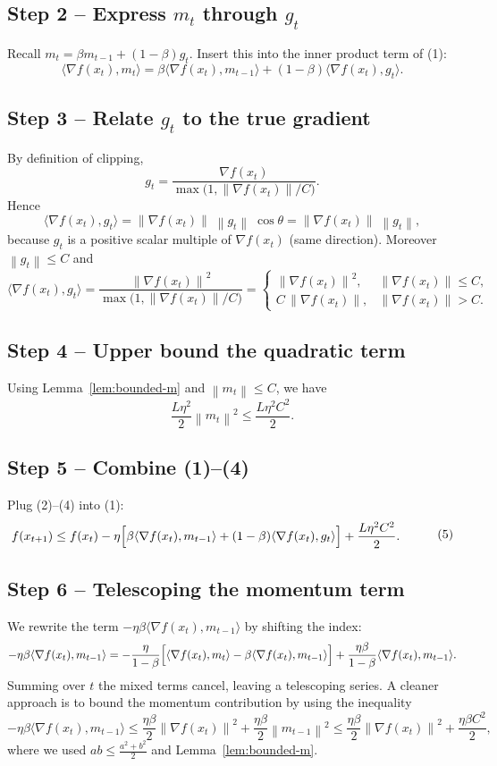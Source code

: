 \documentclass{article}
\newcommand{\norm}[1]{\left\lVert #1\right\rVert}
\newcommand{\grad}{\nabla}
\begin{document}
\subsection*{Step 2 – Express $m_t$ through $g_t$}
Recall $m_t=\beta m_{t-1}+(1-\beta)g_t$.  
Insert this into the inner product term of (1):
\[
\langle\grad f(x_t),m_t\rangle
= \beta\langle\grad f(x_t),m_{t-1}\rangle
+(1-\beta)\langle\grad f(x_t),g_t\rangle .
\tag{2}
\]

\subsection*{Step 3 – Relate $g_t$ to the true gradient}
By definition of clipping,
\[
g_t = \frac{\grad f(x_t)}{\max\!\bigl(1,\norm{\grad f(x_t)}/C\bigr)} .
\]
Hence
\[
\langle\grad f(x_t),g_t\rangle
= \norm{\grad f(x_t)}\;\norm{g_t}\;\cos\theta
= \norm{\grad f(x_t)}\;\norm{g_t},
\]
because $g_t$ is a positive scalar multiple of $\grad f(x_t)$ (same direction). Moreover $\norm{g_t}\le C$ and
\[
\langle\grad f(x_t),g_t\rangle
= \frac{\norm{\grad f(x_t)}^2}{\max\!\bigl(1,\norm{\grad f(x_t)}/C\bigr)}
=
\begin{cases}
\norm{\grad f(x_t)}^2, &\norm{\grad f(x_t)}\le C,\\[4pt]
C\,\norm{\grad f(x_t)}, &\norm{\grad f(x_t)}> C .
\end{cases}
\tag{3}
\]

\subsection*{Step 4 – Upper bound the quadratic term}
Using Lemma~\ref{lem:bounded-m} and $\norm{m_t}\le C$, we have
\[
\frac{L\eta^2}{2}\norm{m_t}^2 \le \frac{L\eta^2 C^2}{2}.
\tag{4}
\]

\subsection*{Step 5 – Combine (1)–(4)}
Plug (2)–(4) into (1):
\[
\begin{aligned}
f(x_{t+1})
&\le f(x_t)
-\eta\Bigl[\beta\langle\grad f(x_t),m_{t-1}\rangle
+(1-\beta)\langle\grad f(x_t),g_t\rangle\Bigr]
+\frac{L\eta^2 C^2}{2}.
\end{aligned}
\tag{5}
\]

\subsection*{Step 6 – Telescoping the momentum term}
We rewrite the term $-\eta\beta\langle\grad f(x_t),m_{t-1}\rangle$ by shifting the index:
\[
-\eta\beta\langle\grad f(x_t),m_{t-1}\rangle
= -\frac{\eta}{1-\beta}
\Bigl[\langle\grad f(x_t),m_t\rangle-\beta\langle\grad f(x_t),m_{t-1}\rangle\Bigr]
+\frac{\eta\beta}{1-\beta}\langle\grad f(x_t),m_{t-1}\rangle .
\]
Summing over $t$ the mixed terms cancel, leaving a telescoping series.  
A cleaner approach is to bound the momentum contribution by using the inequality
\[
-\eta\beta\langle\grad f(x_t),m_{t-1}\rangle
\le \frac{\eta\beta}{2}\norm{\grad f(x_t)}^2
+ \frac{\eta\beta}{2}\norm{m_{t-1}}^2
\le \frac{\eta\beta}{2}\norm{\grad f(x_t)}^2
+ \frac{\eta\beta C^2}{2},
\tag{6}
\]
where we used $ab\le \frac{a^2+b^2}{2}$ and Lemma~\ref{lem:bounded-m}.
\end{document}

